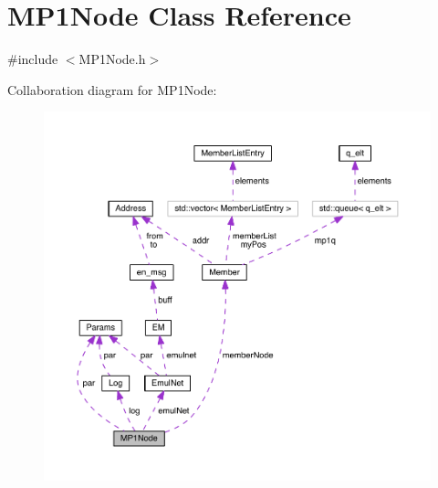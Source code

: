\hypertarget{class_m_p1_node}{}\section{M\+P1\+Node Class Reference}
\label{class_m_p1_node}


{\ttfamily \#include $<$M\+P1\+Node.\+h$>$}



Collaboration diagram for M\+P1\+Node\+:\nopagebreak
\begin{figure}[H]
\begin{center}
\leavevmode
\includegraphics[width=350pt]{d1/de2/class_m_p1_node__coll__graph}
\end{center}
\end{figure}
